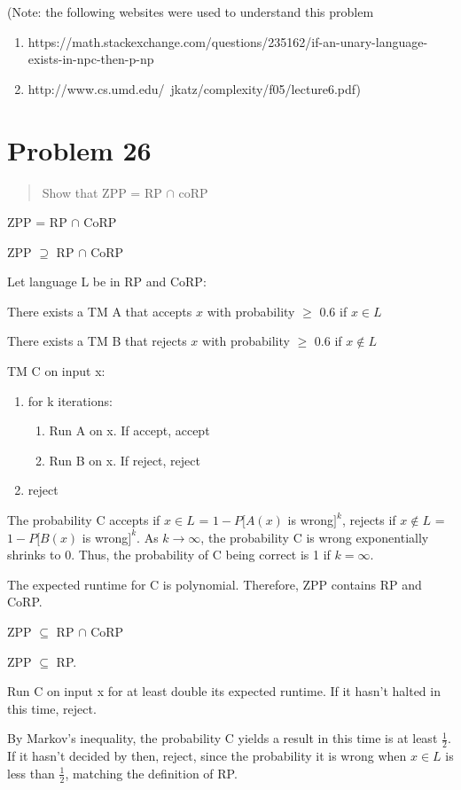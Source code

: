 \documentclass{article}
\begin{document}
(Note: the following websites were used to understand this problem
\begin{enumerate}
\item https://math.stackexchange.com/questions/235162/if-an-unary-language-exists-in-npc-then-p-np
\item http://www.cs.umd.edu/~jkatz/complexity/f05/lecture6.pdf)
\end{enumerate}

\section{Problem 26}
\begin{quote}
Show that ZPP = RP $\cap$ coRP
\end{quote}

ZPP = RP $\cap$ CoRP

\bigskip
ZPP $\supseteq$ RP $\cap$ CoRP

Let language L be in RP and CoRP:

There exists a TM A that accepts $x$ with probability $\geq$ 0.6 if $x \in L$

There exists a TM B that rejects $x$ with probability $\geq$ 0.6 if $x \notin L$

\medskip
TM C on input x:
\begin{enumerate}[label=]
\item for k iterations:
	\begin{enumerate}[label=]
	\item Run A on x.  If accept, accept
	\item Run B on x.  If reject, reject
	\end{enumerate}
\item reject
\end{enumerate}

The probability C accepts if $x \in L$ = $1-P[A(x)$ is wrong$]^k$, rejects if $x \notin L$ = $1-P[B(x)$ is wrong$]^k$.  As $k \rightarrow \infty$, the probability C is wrong exponentially shrinks to 0.  Thus, the probability of C being correct is 1 if $k = \infty$.

The expected runtime for C is polynomial.  Therefore, ZPP contains RP and CoRP.

\bigskip
ZPP $\subseteq$ RP $\cap$ CoRP

ZPP $\subseteq$ RP.

Run C on input x for at least double its expected runtime.  If it hasn't halted in this time, reject.

By Markov's inequality, the probability C yields a result in this time is at least $\frac12$.  If it hasn't decided by then, reject, since the probability it is wrong when $x\in L$ is less than $\frac12$, matching the definition of RP.
\end{document}
